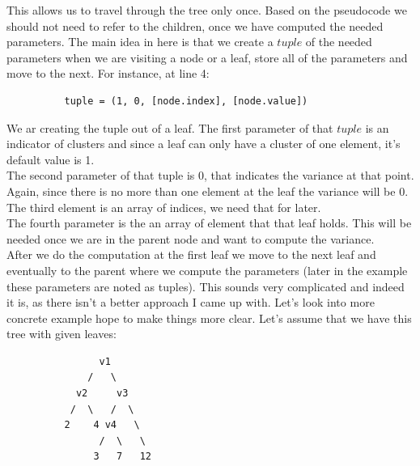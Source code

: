 \documentclass[11pt,a4paper,english]{article}
\begin{document}
        This allows us to travel through the tree only once. Based on the pseudocode we should not need to refer to the children, once we have computed the needed parameters. The main idea in here is that we create a $tuple$ of the needed parameters when we are visiting a node or a leaf, store all of the parameters and move to the next. For instance, at line 4:
        \begin{verbatim}
          tuple = (1, 0, [node.index], [node.value])
        \end{verbatim}
        We ar creating the tuple out of a leaf. The first parameter of that $tuple$ is an indicator of clusters and since a leaf can only have a cluster of one element, it's default value is 1. \\
        The second parameter of that tuple is $0$, that indicates the variance at that point. Again, since there is no more than one element at the leaf the variance will be $0$. \\
        The third element is an array of indices, we need that for later. \\
        The fourth parameter is the an array of element that that leaf holds. This will be needed once we are in the parent node and want to compute the variance.\\
        After we do the computation at the first leaf we move to the next leaf and eventually to the parent where we compute the parameters (later in the example these parameters are noted as tuples).
        This sounds very complicated and indeed it is, as there isn't a better approach I came up with. Let's look into more concrete example hope to make things more clear. Let's assume that we have this tree with given leaves:
        \begin{verbatim}
                v1
              /   \
            v2     v3
           /  \   /  \
          2    4 v4   \
                /  \   \
               3   7   12
        \end{verbatim}
\end{document}
